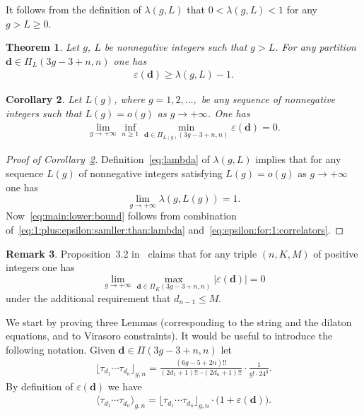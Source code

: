 \documentclass[pdftex]{sigma}
\renewcommand{\epsilon}{\varepsilon}
\newtheorem{Theorem}{Theorem}
\newtheorem{Corollary}[Theorem]{Corollary}
\theoremstyle{definition}
\newtheorem{Remark}[Theorem]{Remark}
\begin{document}
It follows from the definition of $\lambda(g,L)$ that $0<\lambda(g,L)<1$ for any $g>L\ge 0$.

\begin{Theorem}\label{th:Main:Theorem}
Let $g$, $L$ be nonnegative integers such that $g>L$. For any partition
$\boldsymbol{d}\in\Pi_{L}(3g-3+n,n)$ one has
\begin{gather}
\label{eq:1:plus:epsilon:samller:than:lambda}
\epsilon(\boldsymbol{d})\ge\lambda(g,L)-1 .
\end{gather}
\end{Theorem}

\begin{Corollary}\label{cor:inf:0}
Let $L(g)$, where $g=1,2,\dots,$ be any sequence of nonnegative integers such that $L(g)=o(g)$ as $g\to+\infty$. One has
\begin{gather}
\label{eq:main:lower:bound}
\lim_{g\to+\infty}\inf_{n\ge 1}\min_{\boldsymbol{d}\in\Pi_{L(g)}(3g-3+n,n)}\epsilon(\boldsymbol{d})=0 .
\end{gather}
\end{Corollary}

\begin{proof}[Proof of Corollary~\ref{cor:inf:0}]
Definition~\eqref{eq:lambda} of $\lambda(g,L)$ implies that for any sequence $L(g)$ of nonnegative integers satisfying $L(g)=o(g)$ as $g\to+\infty$ one has
\[
\lim_{g\to+\infty} \lambda(g,L(g))=1 .
\]
Now~\eqref{eq:main:lower:bound} follows from combination of~\eqref{eq:1:plus:epsilon:samller:than:lambda} and~\eqref{eq:epsilon:for:1:correlators}.
\end{proof}

\begin{Remark}Proposition~3.2 in~\cite{Liu:Xu} claims
that for any triple $(n,K,M)$ of positive integers one has
\[
\lim_{g\to+\infty}\max_{\boldsymbol{d}\in\Pi_K(3g-3+n,n)}|\epsilon(\boldsymbol{d})|=0
\]
under the additional requirement that $d_{n-1}\le M$.
\end{Remark}

We start by proving three Lemmas (corresponding to
the string and the dilaton equations, and to Virasoro constraints).
It would be useful to introduce the following notation.
Given $\boldsymbol{d}\in\Pi(3g-3+n,n)$ let
\begin{gather}\label{eq:floor:brackets}
\lfloor \tau_{d_1} \cdots \tau_{d_n}\rfloor_{g,n}=
\frac{(6g-5+2n)!!}{(2d_1+1)!!\cdots(2d_n+1)!!}
\cdot\frac{1}{g!\cdot 24^g} .
\end{gather}
By definition of $\epsilon(\boldsymbol{d})$ we have
\begin{gather}\label{eq:def:of:epsilon}
\langle \tau_{d_1} \cdots \tau_{d_n}\rangle_{g,n}
=
\lfloor \tau_{d_1} \cdots \tau_{d_n}\rfloor_{g,n}
\cdot\big(1+\epsilon(\boldsymbol{d})\big) .
\end{gather}
\end{document}
